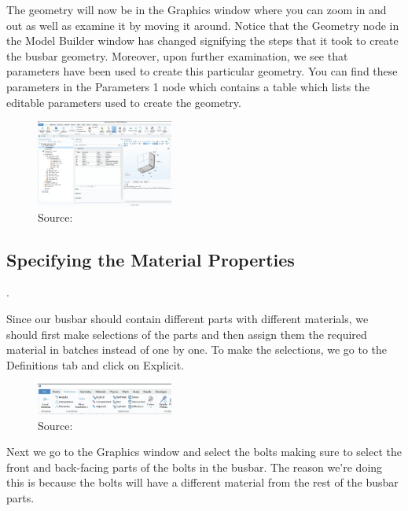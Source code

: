 The geometry will now be in the Graphics window where you can zoom in and out as well as examine it by moving it around. Notice that the Geometry node in the Model Builder window has changed signifying the steps that it took to create the busbar geometry. Moreover, upon further examination, we see that parameters have been used to create this particular geometry. You can find these parameters in the Parameters 1 node which contains a table which lists the editable parameters used to create the geometry.

\begin{figure}[ht!]
  \centering
  \includegraphics[width=0.4\textwidth]{Chapters/Figures/Chapter 3 Figures/Initial Busbar Geom.png}
  \caption{ Source: \cite{}}
  \label{}
\end{figure}

\subsection{Specifying the Material Properties}.

Since our busbar should contain different parts with different materials, we should first make selections of the parts and then assign them the required material in batches instead of one by one. To make the selections, we go to the Definitions tab and click on Explicit.

\begin{figure}[ht!]
  \centering
  \includegraphics[width=0.4\textwidth]{Chapters/Figures/Chapter 3 Figures/Explicit Choice Selection from Definitions Tab.png}
  \caption{ Source: \cite{}}
  \label{}
\end{figure}

Next we go to the Graphics window and select the bolts making sure to select the front and back-facing parts of the bolts in the busbar. The reason we're doing this is because the bolts will have a different material from the rest of the busbar parts.


